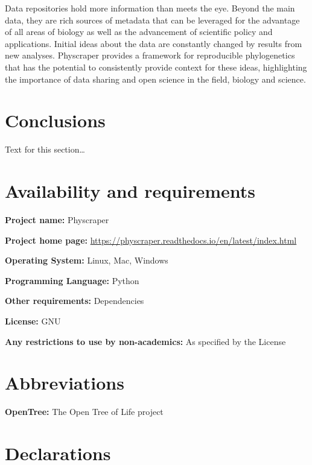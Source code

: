 \documentclass{bmcart}
\begin{document}
Data repositories hold more information than meets the eye.
Beyond the main data, they are rich sources of metadata that can be leveraged
for the advantage of all areas of biology as well as the advancement of scientific
policy and applications.
Initial ideas about the data are constantly changed by results from new analyses.
Physcraper provides a framework for reproducible phylogenetics that has the
potential to consistently provide context for these ideas, highlighting the
importance of data sharing and open science in the field, biology and science.


\section*{Conclusions}
Text for this section\ldots

\section*{Availability and requirements}

\textbf{Project name:} Physcraper

\textbf{Project home page:} \href{https://physcraper.readthedocs.io/en/latest/index.html}{https://physcraper.readthedocs.io/en/latest/index.html}

\textbf{Operating System:} Linux, Mac, Windows

\textbf{Programming Language:} Python

\textbf{Other requirements:} Dependencies

\textbf{License:} GNU

\textbf{Any restrictions to use by non-academics:} As specified by the License

\section*{Abbreviations}

\textbf{OpenTree:} The Open Tree of Life project

\section*{Declarations}
\end{document}
